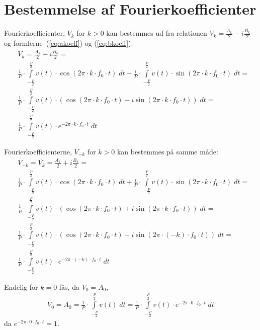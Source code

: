 \documentclass[11pt,a4paper]{article}
\begin{document}
\section{Bestemmelse af Fourierkoefficienter}
Fourierkoefficienter, $V_k$ for $k>0$ kan bestemmes ud fra relationen $V_k=\frac{A_k}{2}-i\frac{B_k}{2}$ og formlerne~(\ref{eq:akoeff}) og (\ref{eq:bkoeff}).
\begin{align}
&V_k = \frac{A_k}{2}-i\frac{B_k}{2} = \nonumber\\
&\frac{1}{P}\cdot\int\limits_{-\frac{P}{2}}^{\frac{P}{2}}v(t)\cdot\cos(2\pi\cdot{}k\cdot{}f_{0}\cdot{}t)\;dt -  \frac{i}{P}\cdot\int\limits_{-\frac{P}{2}}^{\frac{P}{2}}v(t)\cdot\sin(2\pi\cdot{}k\cdot{}f_{0}\cdot{}t)\;dt = \nonumber\\
&\frac{1}{P}\cdot\int\limits_{-\frac{P}{2}}^{\frac{P}{2}}v(t)\cdot\left(\cos(2\pi\cdot{}k\cdot{}f_{0}\cdot{}t) - i\sin(2\pi\cdot{}k\cdot{}f_{0}\cdot{}t)\right)\;dt = \nonumber\\
&\frac{1}{P}\cdot\int\limits_{-\frac{P}{2}}^{\frac{P}{2}}v(t)\cdot{}e^{-2\pi\cdot{}k\cdot{}f_0\cdot{}t}\;dt\label{eq:vposkoeff}
\end{align}

\noindent{}Fourierkoefficienterne, $V_{-k}$ for $k>0$ kan bestemmes på samme måde:
\begin{align}
&V_{-k} = \overline{V_k} = \frac{A_k}{2}+i\frac{B_k}{2} = \nonumber\\
&\frac{1}{P}\cdot\int\limits_{-\frac{P}{2}}^{\frac{P}{2}}v(t)\cdot\cos(2\pi\cdot{}k\cdot{}f_{0}\cdot{}t)\;dt +  \frac{i}{P}\cdot\int\limits_{-\frac{P}{2}}^{\frac{P}{2}}v(t)\cdot\sin(2\pi\cdot{}k\cdot{}f_{0}\cdot{}t)\;dt = \nonumber\\
&\frac{1}{P}\cdot\int\limits_{-\frac{P}{2}}^{\frac{P}{2}}v(t)\cdot\left(\cos(2\pi\cdot{}k\cdot{}f_{0}\cdot{}t) + i\sin(2\pi\cdot{}k\cdot{}f_{0}\cdot{}t)\right)\;dt = \nonumber\\
&\frac{1}{P}\cdot\int\limits_{-\frac{P}{2}}^{\frac{P}{2}}v(t)\cdot\left(\cos(2\pi\cdot{}k\cdot{}f_{0}\cdot{}t) - i\sin(2\pi\cdot{}(-k)\cdot{}f_{0}\cdot{}t)\right)\;dt = \nonumber\\
&\frac{1}{P}\cdot\int\limits_{-\frac{P}{2}}^{\frac{P}{2}}v(t)\cdot{}e^{-2\pi\cdot{}(-k)\cdot{}f_0\cdot{}t}\;dt\label{eq:vnegkoeff}
\end{align}

\noindent{}Endelig for $k=0$ fås, da $V_0=A_0$,
\begin{gather}
V_0 = A_0 = \frac{1}{P}\cdot{}\int\limits_{-\frac{P}{2}}^{\frac{P}{2}}v(t)\;dt = \frac{1}{P}\cdot{}\int\limits_{-\frac{P}{2}}^{\frac{P}{2}}v(t)\cdot{}e^{-2\pi\cdot{}0\cdot{}f_0\cdot{}t}\;dt\label{eq:vzerokoeff}
\end{gather}
\noindent{}da $e^{-2\pi\cdot{}0\cdot{}f_0\cdot{}t}=1$. 
\end{document}
